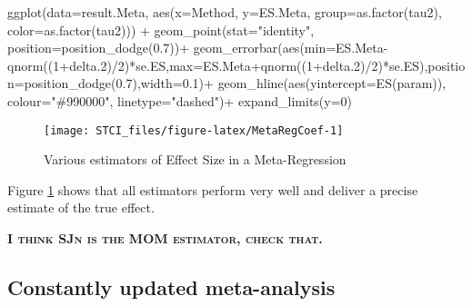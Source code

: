 \documentclass[
]{book}
\newenvironment{Shaded}{\begin{snugshade}}{\end{snugshade}}
\newcommand{\AttributeTok}[1]{\textcolor[rgb]{0.77,0.63,0.00}{#1}}
\newcommand{\DecValTok}[1]{\textcolor[rgb]{0.00,0.00,0.81}{#1}}
\newcommand{\FloatTok}[1]{\textcolor[rgb]{0.00,0.00,0.81}{#1}}
\newcommand{\FunctionTok}[1]{\textcolor[rgb]{0.00,0.00,0.00}{#1}}
\newcommand{\NormalTok}[1]{#1}
\newcommand{\SpecialCharTok}[1]{\textcolor[rgb]{0.00,0.00,0.00}{#1}}
\newcommand{\StringTok}[1]{\textcolor[rgb]{0.31,0.60,0.02}{#1}}
\theoremstyle{definition}
\theoremstyle{definition}
\theoremstyle{definition}
\theoremstyle{definition}
\theoremstyle{remark}
\begin{document}
\begin{Shaded}
\begin{Highlighting}[]
\FunctionTok{ggplot}\NormalTok{(}\AttributeTok{data=}\NormalTok{result.Meta, }\FunctionTok{aes}\NormalTok{(}\AttributeTok{x=}\NormalTok{Method, }\AttributeTok{y=}\NormalTok{ES.Meta, }\AttributeTok{group=}\FunctionTok{as.factor}\NormalTok{(tau2), }\AttributeTok{color=}\FunctionTok{as.factor}\NormalTok{(tau2))) }\SpecialCharTok{+}
    \FunctionTok{geom\_point}\NormalTok{(}\AttributeTok{stat=}\StringTok{"identity"}\NormalTok{, }\AttributeTok{position=}\FunctionTok{position\_dodge}\NormalTok{(}\FloatTok{0.7}\NormalTok{))}\SpecialCharTok{+}
    \FunctionTok{geom\_errorbar}\NormalTok{(}\FunctionTok{aes}\NormalTok{(}\AttributeTok{min=}\NormalTok{ES.Meta}\SpecialCharTok{{-}}\FunctionTok{qnorm}\NormalTok{((}\DecValTok{1}\SpecialCharTok{+}\NormalTok{delta}\FloatTok{.2}\NormalTok{)}\SpecialCharTok{/}\DecValTok{2}\NormalTok{)}\SpecialCharTok{*}\NormalTok{se.ES,}\AttributeTok{max=}\NormalTok{ES.Meta}\SpecialCharTok{+}\FunctionTok{qnorm}\NormalTok{((}\DecValTok{1}\SpecialCharTok{+}\NormalTok{delta}\FloatTok{.2}\NormalTok{)}\SpecialCharTok{/}\DecValTok{2}\NormalTok{)}\SpecialCharTok{*}\NormalTok{se.ES),}\AttributeTok{position=}\FunctionTok{position\_dodge}\NormalTok{(}\FloatTok{0.7}\NormalTok{),}\AttributeTok{width=}\FloatTok{0.1}\NormalTok{)}\SpecialCharTok{+}
    \FunctionTok{geom\_hline}\NormalTok{(}\FunctionTok{aes}\NormalTok{(}\AttributeTok{yintercept=}\FunctionTok{ES}\NormalTok{(param)), }\AttributeTok{colour=}\StringTok{"\#990000"}\NormalTok{, }\AttributeTok{linetype=}\StringTok{"dashed"}\NormalTok{)}\SpecialCharTok{+}
    \FunctionTok{expand\_limits}\NormalTok{(}\AttributeTok{y=}\DecValTok{0}\NormalTok{)}
\end{Highlighting}
\end{Shaded}

\begin{figure}[htbp]

{\centering \texttt{[image: STCI\_files/figure-latex/MetaRegCoef-1]} 

}

\caption{Various estimators of Effect Size in a Meta-Regression}\label{fig:MetaRegCoef}
\end{figure}

Figure \ref{fig:MetaRegCoef} shows that all estimators perform very well and deliver a precise estimate of the true effect.

\textbf{\textsc{I think SJn is the MOM estimator, check that.}}

\hypertarget{constantly-updated-meta-analysis}{%
\subsection{Constantly updated meta-analysis}\label{constantly-updated-meta-analysis}}
\end{document}
